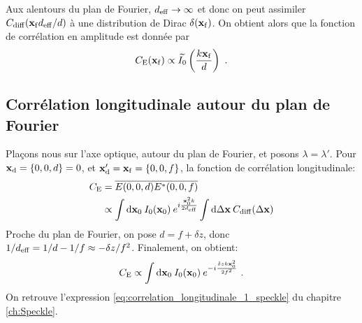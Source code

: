 Aux alentours du plan de Fourier, $d_{\mathrm{eff}}\rightarrow\infty$ et donc on peut assimiler $C_{\mathrm{diff}}(\mathbf{x}_{\mathrm{f}}d_{\mathrm{eff}}/d)$ à une distribution de Dirac $\delta(\mathbf{x}_{\mathrm{f}})$. On obtient alors que la fonction de corrélation en amplitude est donnée par
\begin{equation}
C_{\mathrm{E}}(\mathbf{x}_{\mathrm{f}})\propto \widetilde{I_0}\left(\frac{k\mathbf{x}_{\mathrm{f}}}{d}\right) \text{ .}
\end{equation}


\subsection{Corrélation longitudinale autour du plan de Fourier}
Plaçons nous sur l'axe optique, autour du plan de Fourier, et posons $\lambda=\lambda'$. Pour $\mathbf{x}_{\mathrm{d}}=\lbrace 0,0,d \rbrace=0$, et $\mathbf{x}_{\mathrm{d}}'=\mathbf{x}_{\mathrm{f}}=\lbrace 0,0,f \rbrace$, la fonction de corrélation longitudinale:
\begin{align}
C_{\mathrm{E}}&=\overline{E(0,0,d)E^*(0,0,f)} \\
& \propto \int{\mathop{}\mathopen{}\mathrm{d}\mathbf{x}_0\: I_0(\mathbf{x}_0) \: e^{i\frac{\mathbf{x}_0^2 k}{2 d_{\mathrm{eff}}}} \int{\mathop{}\mathopen{}\mathrm{d}\Delta\mathbf{x}\: C_{\mathrm{diff}}(\Delta\mathbf{x})}}
\end{align}
Proche du plan de Fourier, on pose $d=f+\delta z$, donc $1/d_{\mathrm{eff}}=1/d-1/f\approx-\delta z/f^2$. Finalement, on obtient:
\begin{equation}
C_{\mathrm{E}} \propto \int{\mathop{}\mathopen{}\mathrm{d}\mathbf{x}_0\: I_0(\mathbf{x}_0) \: e^{-i\frac{\delta z k \mathbf{x}_0^2}{2f^2}}} \text{ .}
\end{equation}
On retrouve l'expression \ref{eq:correlation_longitudinale_1_speckle} du chapitre \ref{ch:Speckle}.



